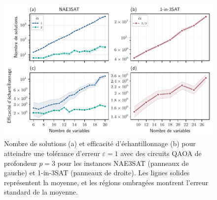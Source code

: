 \begin{figure}[ht!]
    \centering
    \includegraphics[width=1\textwidth]{figures/sampling-efficiency.pdf}
    \caption[Efficacité de l'échantillonnage pour des problèmes \#P-difficile]{Nombre de solutions (a) et efficacité d'échantillonnage (b) pour atteindre une tolérance d'erreur $\varepsilon = 1$ avec des circuits QAOA de profondeur $p=3$ pour les instances NAE3SAT (panneaux de gauche) et 1-in-3SAT (panneaux de droite). Les lignes solides représentent la moyenne, et les régions ombragées montrent l'erreur standard de la moyenne.}
    \label{fig:sampling-efficiency}
\end{figure}


